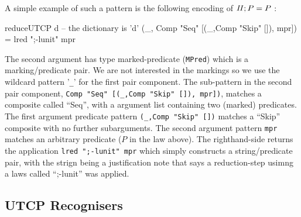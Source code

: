 A simple example of such a pattern is the following encoding
of $\mathit{II};P = P$ :
\begin{code}
reduceUTCP d   -- the dictionary is 'd'
  (_, Comp "Seq" [(_,Comp "Skip" []), mpr]) = lred ";-lunit" mpr
\end{code}
The second argument has type marked-predicate (\texttt{MPred})
which is a marking/predicate pair.
We are not interested in the markings
so we use the wildcard pattern '\verb"_"'
for the first pair component.
The sub-pattern in the second pair component,
\verb'Comp "Seq" [(_,Comp "Skip" []), mpr])',
matches a composite called ``Seq'',
with a argument list containing two (marked) predicates.
The first argument predicate pattern \verb'(_,Comp "Skip" [])'
matches a ``Skip'' composite with no further subarguments.
The second argument pattern \verb'mpr' matches an arbitrary predicate
($P$ in the law above).
The righthand-side returns the application \verb'lred ";-lunit" mpr'
which simply constructs a string/predicate pair,
with the strign being a justification note that says a reduction-step
usimng a laws called ``;-lunit'' was applied.



\subsection{UTCP Recognisers}

